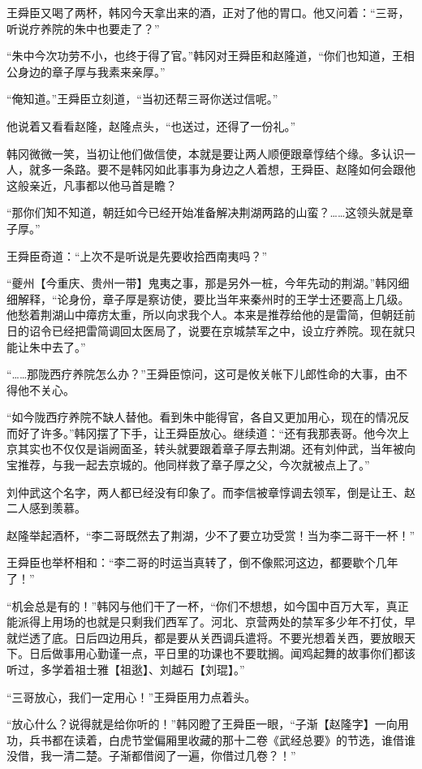王舜臣又喝了两杯，韩冈今天拿出来的酒，正对了他的胃口。他又问着：“三哥，听说疗养院的朱中也要走了？”

“朱中今次功劳不小，也终于得了官。”韩冈对王舜臣和赵隆道，“你们也知道，王相公身边的章子厚与我素来亲厚。”

“俺知道。”王舜臣立刻道，“当初还帮三哥你送过信呢。”

他说着又看看赵隆，赵隆点头，“也送过，还得了一份礼。”

韩冈微微一笑，当初让他们做信使，本就是要让两人顺便跟章惇结个缘。多认识一人，就多一条路。要不是韩冈如此事事为身边之人着想，王舜臣、赵隆如何会跟他这般亲近，凡事都以他马首是瞻？

“那你们知不知道，朝廷如今已经开始准备解决荆湖两路的山蛮？……这领头就是章子厚。”

王舜臣奇道：“上次不是听说是先要收拾西南夷吗？”

“夔州【今重庆、贵州一带】鬼夷之事，那是另外一桩，今年先动的荆湖。”韩冈细细解释，“论身份，章子厚是察访使，要比当年来秦州时的王学士还要高上几级。他愁着荆湖山中瘴疠太重，所以向求我个人。本来是推荐给他的是雷简，但朝廷前日的诏令已经把雷简调回太医局了，说要在京城禁军之中，设立疗养院。现在就只能让朱中去了。”

“……那陇西疗养院怎么办？”王舜臣惊问，这可是攸关帐下儿郎性命的大事，由不得他不关心。

“如今陇西疗养院不缺人替他。看到朱中能得官，各自又更加用心，现在的情况反而好了许多。”韩冈摆了下手，让王舜臣放心。继续道：“还有我那表哥。他今次上京其实也不仅仅是诣阙面圣，转头就要跟着章子厚去荆湖。还有刘仲武，当年被向宝推荐，与我一起去京城的。他同样救了章子厚之父，今次就被点上了。”

刘仲武这个名字，两人都已经没有印象了。而李信被章惇调去领军，倒是让王、赵二人感到羡慕。

赵隆举起酒杯，“李二哥既然去了荆湖，少不了要立功受赏！当为李二哥干一杯！”

王舜臣也举杯相和：“李二哥的时运当真转了，倒不像熙河这边，都要歇个几年了！”

“机会总是有的！”韩冈与他们干了一杯，“你们不想想，如今国中百万大军，真正能派得上用场的也就是只剩我们西军了。河北、京营两处的禁军多少年不打仗，早就烂透了底。日后四边用兵，都是要从关西调兵遣将。不要光想着关西，要放眼天下。日后做事用心勤谨一点，平日里的功课也不要耽搁。闻鸡起舞的故事你们都该听过，多学着祖士雅【祖逖】、刘越石【刘琨】。”

“三哥放心，我们一定用心！”王舜臣用力点着头。

“放心什么？说得就是给你听的！”韩冈瞪了王舜臣一眼，“子渐【赵隆字】一向用功，兵书都在读着，白虎节堂偏厢里收藏的那十二卷《武经总要》的节选，谁借谁没借，我一清二楚。子渐都借阅了一遍，你借过几卷？！”

